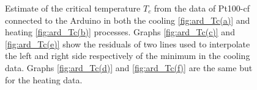 \documentclass[rmp,10pt,onecolumn,fleqn,notitlepage]{revtex4-1}
\begin{document}
\begin{figure}[H]
\begin{minipage}[c]{0.49\linewidth}
\end{minipage}
\begin{minipage}[]{0.49\linewidth}
\centering
{}
\end{minipage}
\caption{\label{fig:ard_Tc} Estimate of the critical temperature $T_c$ from the data of Pt100-cf connected to the Arduino in both the cooling \ref{fig:ard_Tc(a)} and heating \ref{fig:ard_Tc(b)} processes. Graphs \ref{fig:ard_Tc(c)} and \ref{fig:ard_Tc(e)} show the residuals of two lines used to interpolate the left and right side respectively of the minimum in the cooling data. Graphs \ref{fig:ard_Tc(d)} and \ref{fig:ard_Tc(f)} are the same but for the heating data.}
\end{figure}
\end{document}
